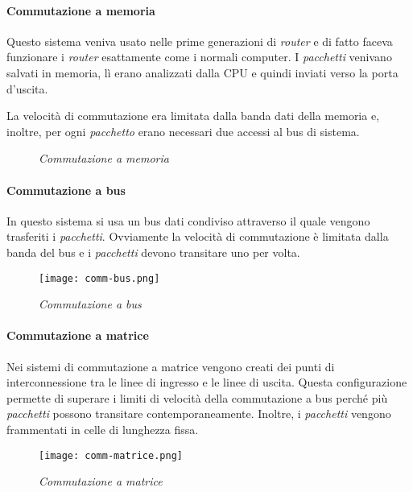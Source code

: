 \paragraph{Commutazione a memoria}
Questo sistema veniva usato nelle prime generazioni di \emph{router} e di fatto
faceva funzionare i \emph{router} esattamente come i normali computer.
I \emph{pacchetti} venivano salvati in memoria, lì erano analizzati dalla CPU e
quindi inviati verso la porta d'uscita.

La velocità di commutazione era limitata dalla banda dati della memoria e, inoltre,
per ogni \emph{pacchetto} erano necessari due accessi al bus di sistema.

\begin{figure}[h]
    \centering
    \hfill
    \caption{\emph{Commutazione a memoria}}
\end{figure}

\paragraph{Commutazione a bus}
In questo sistema si usa un bus dati condiviso attraverso il quale vengono
trasferiti i \emph{pacchetti}. Ovviamente la velocità di commutazione è limitata
dalla banda del bus e i \emph{pacchetti} devono transitare uno per volta.

\begin{figure}[ht]
    \centering
    \texttt{[image: comm-bus.png]}
    \caption{\emph{Commutazione a bus}}
\end{figure}
\newpage

\paragraph{Commutazione a matrice}
Nei sistemi di commutazione a matrice vengono creati dei punti di
interconnessione tra le linee di ingresso e le linee di uscita. Questa
configurazione permette di superare i limiti di velocità della commutazione a
bus perché più \emph{pacchetti} possono transitare contemporaneamente.
Inoltre, i \emph{pacchetti} vengono frammentati in celle di lunghezza fissa.

\begin{figure}[h!]
    \centering
    \texttt{[image: comm-matrice.png]}
    \caption{\emph{Commutazione a matrice}}
\end{figure}

